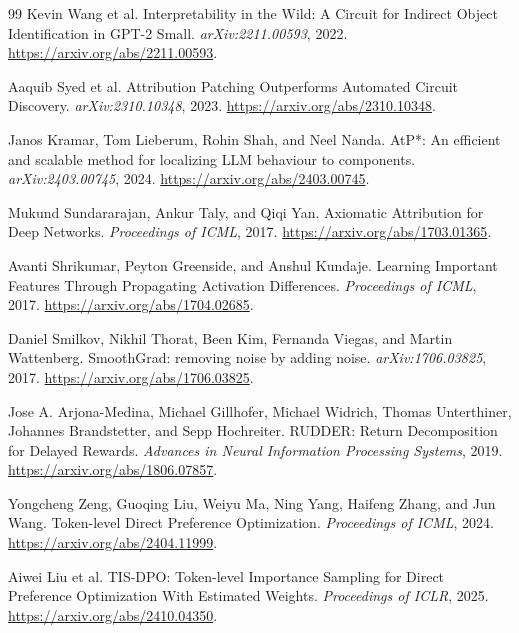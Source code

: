 \documentclass[11pt]{article}
\begin{document}
\begin{thebibliography}{99}
Kevin Wang et al.
\newblock Interpretability in the Wild: A Circuit for Indirect Object
Identification in GPT-2 Small.
\newblock \emph{arXiv:2211.00593}, 2022.
\newblock \url{https://arxiv.org/abs/2211.00593}.

Aaquib Syed et al.
\newblock Attribution Patching Outperforms Automated Circuit Discovery.
\newblock \emph{arXiv:2310.10348}, 2023.
\newblock \url{https://arxiv.org/abs/2310.10348}.

Janos Kramar, Tom Lieberum, Rohin Shah, and Neel Nanda.
\newblock AtP*: An efficient and scalable method for localizing LLM behaviour
to components.
\newblock \emph{arXiv:2403.00745}, 2024.
\newblock \url{https://arxiv.org/abs/2403.00745}.

Mukund Sundararajan, Ankur Taly, and Qiqi Yan.
\newblock Axiomatic Attribution for Deep Networks.
\newblock \emph{Proceedings of ICML}, 2017.
\newblock \url{https://arxiv.org/abs/1703.01365}.

Avanti Shrikumar, Peyton Greenside, and Anshul Kundaje.
\newblock Learning Important Features Through Propagating Activation
Differences.
\newblock \emph{Proceedings of ICML}, 2017.
\newblock \url{https://arxiv.org/abs/1704.02685}.

Daniel Smilkov, Nikhil Thorat, Been Kim, Fernanda Viegas, and Martin
Wattenberg.
\newblock SmoothGrad: removing noise by adding noise.
\newblock \emph{arXiv:1706.03825}, 2017.
\newblock \url{https://arxiv.org/abs/1706.03825}.

Jose A. Arjona-Medina, Michael Gillhofer, Michael Widrich, Thomas Unterthiner,
Johannes Brandstetter, and Sepp Hochreiter.
\newblock RUDDER: Return Decomposition for Delayed Rewards.
\newblock \emph{Advances in Neural Information Processing Systems}, 2019.
\newblock \url{https://arxiv.org/abs/1806.07857}.

Yongcheng Zeng, Guoqing Liu, Weiyu Ma, Ning Yang, Haifeng Zhang, and Jun Wang.
\newblock Token-level Direct Preference Optimization.
\newblock \emph{Proceedings of ICML}, 2024.
\newblock \url{https://arxiv.org/abs/2404.11999}.

Aiwei Liu et al.
\newblock TIS-DPO: Token-level Importance Sampling for Direct Preference
Optimization With Estimated Weights.
\newblock \emph{Proceedings of ICLR}, 2025.
\newblock \url{https://arxiv.org/abs/2410.04350}.


\end{thebibliography}
\end{document}
